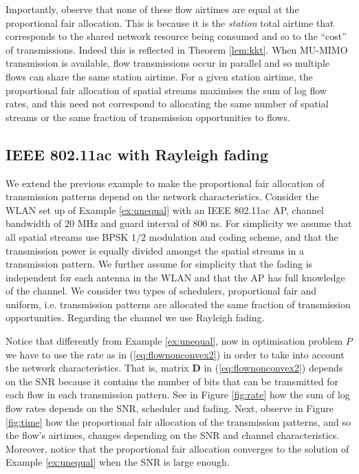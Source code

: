 \documentclass[11pt]{amsart}
\def\m#1{\mathbf{#1}}
\begin{document}
Importantly, observe that none of these flow airtimes are equal at the proportional fair allocation.   This is because it is the \emph{station} total airtime that corresponds to the shared network resource being consumed and so to the ``cost'' of transmissions.  Indeed this is reflected in Theorem \ref{lem:kkt}.   When MU-MIMO transmission is available, flow transmissions occur in parallel and so multiple flows can share the same station airtime.  For a given station airtime, the proportional fair allocation of spatial streams maximises  the sum of log flow rates, and this need not correspond to allocating the same number of spatial streams or the same fraction of transmission opportunities to flows.

\subsection{IEEE 802.11ac with Rayleigh fading} \label{sec:exampleac} 

We extend the previous example to make the proportional fair allocation of transmission patterns depend on the network characteristics. Consider the WLAN set up of Example \ref{ex:unequal} with an IEEE 802.11ac AP,  channel bandwidth of 20 MHz and guard interval of $800$ ns. For simplicity we assume that all spatial streams use BPSK $1/2$ modulation and coding scheme, and that the transmission power is equally divided amongst the spatial streams in a transmission pattern. We further assume for simplicity that the fading is independent for each antenna in the WLAN and that the AP has full knowledge of the channel. We consider two types of schedulers, proportional fair and uniform, i.e. transmission patterns are allocated the same fraction of transmission opportunities. Regarding the channel we use Rayleigh fading.

Notice that differently from Example \ref{ex:unequal}, now in optimisation problem $P$ we have to use the rate as in (\ref{eq:flownonconvex2}) in order to take into account the network characteristics. That is, matrix $\m{D}$ in (\ref{eq:flownonconvex2}) depends on the SNR because it contains the number of bits that can be transmitted for each flow in each transmission pattern. See in Figure \ref{fig:rate} how the sum of log flow rates depends on the SNR, scheduler and fading. Next, observe in Figure \ref{fig:time} how the proportional fair allocation of the transmission patterns, and so the flow's airtimes, changes depending on the SNR and channel characteristics. Moreover, notice that the proportional fair allocation converges to the solution of Example \ref{ex:unequal} when the SNR is large enough. 
\end{document}

